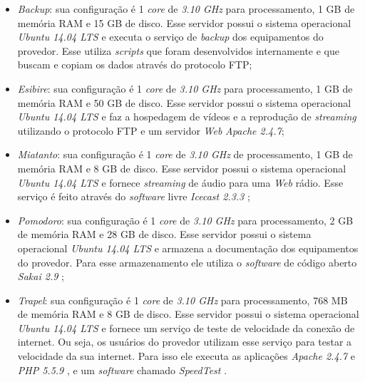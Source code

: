 \begin{itemize}
 \item \textit{Backup}: sua configuração é 1 \textit{core} de \textit{3.10 GHz} para processamento, 1 GB de memória RAM e 15 GB de disco. 
 Esse servidor possui o sistema operacional \textit{Ubuntu 14.04 \ac{LTS}} \cite{ubuntu} e executa o serviço de \textit{backup} dos equipamentos 
 do provedor. Esse utiliza \textit{scripts} que foram desenvolvidos internamente e que buscam e copiam os dados através do protocolo \ac{FTP};
 
 \item \textit{Esibire}: sua configuração é 1 \textit{core} de \textit{3.10 GHz} para processamento, 1 GB de memória RAM e 50 GB de disco. 
 Esse servidor possui o sistema operacional \textit{Ubuntu 14.04 \ac{LTS}} \cite{ubuntu} e faz a hospedagem de vídeos e a reprodução de 
 \textit{streaming} utilizando o protocolo \ac{FTP} e um servidor \textit{Web} \textit{Apache 2.4.7};
 
 \item \textit{Miatanto}: sua configuração é 1 \textit{core} de \textit{3.10 GHz} de processamento, 1 GB de memória RAM e 8 GB de disco. 
 Esse servidor possui o sistema operacional \textit{Ubuntu 14.04 \ac{LTS}} \cite{ubuntu} e fornece \textit{streaming} de áudio para uma \textit{Web} 
 rádio. Esse serviço é feito através do \textit{software} livre \textit{Icecast 2.3.3} \cite{icecast};
 
 \item \textit{Pomodoro}: sua configuração é 1 \textit{core} de \textit{3.10 GHz} para processamento, 2 GB de memória RAM e 28 GB de disco. 
 Esse servidor possui o sistema operacional \textit{Ubuntu 14.04 \ac{LTS}} \cite{ubuntu} e armazena a documentação dos equipamentos do provedor. 
 Para esse armazenamento ele utiliza o \textit{software} de código aberto \textit{Sakai 2.9} \cite{sakai};
 
 \item \textit{Trapel}: sua configuração é 1 \textit{core} de \textit{3.10 GHz} para processamento, 768 MB de memória RAM e 8 GB de disco. 
 Esse servidor possui o sistema operacional \textit{Ubuntu 14.04 \ac{LTS}} \cite{ubuntu} e fornece um serviço de teste de velocidade da conexão 
 de internet. Ou seja, os usuários do provedor utilizam esse serviço para testar a velocidade da sua internet. Para isso ele executa as aplicações 
 \textit{Apache 2.4.7} \cite{apache} e \textit{\ac{PHP} 5.5.9} \cite{php}, e um \textit{software} chamado \textit{SpeedTest} \cite{speedtest}.
\end{itemize}

